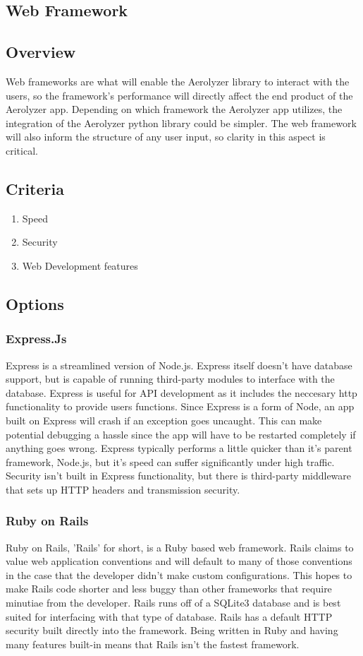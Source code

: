 \documentclass[onecolumn, draftclsnofoot,10pt, compsoc]{IEEEtran}
\begin{document}
\begin{singlespace}
\section{Web Framework}
\subsection{Overview}
Web frameworks are what will enable the Aerolyzer library to interact with the users, so the framework's performance will directly affect the end product of the Aerolyzer app. Depending on which framework the Aerolyzer app utilizes, the integration of the Aerolyzer python library could be simpler. The web framework will also inform the structure of any user input, so clarity in this aspect is critical.
\subsection{Criteria}
\begin{enumerate}
\item Speed
\item Security
\item Web Development features
\end{enumerate}
\subsection{Options}
\subsubsection{Express.Js}
Express is a streamlined version of Node.js.
Express itself doesn't have database support, but is capable of running third-party modules to interface with the database.
Express is useful for API development as it includes the neccesary http functionality to provide users functions.
Since Express is a form of Node, an app built on Express will crash if an exception goes uncaught. This can make potential debugging a hassle since the app will have to be restarted completely if anything goes wrong.
Express typically performs a little quicker than it's parent framework, Node.js, but it's speed can suffer significantly under high traffic.
Security isn't built in Express functionality, but there is third-party middleware that sets up HTTP headers and transmission security.
\cite{Express}
\subsubsection{Ruby on Rails}
Ruby on Rails, 'Rails' for short, is a Ruby based web framework.
Rails claims to value web application conventions and will default to many of those conventions in the case that the developer didn't make custom configurations.
This hopes to make Rails code shorter and less buggy than other frameworks that require minutiae from the developer.
Rails runs off of a SQLite3 database and is best suited for interfacing with that type of database.
Rails has a default HTTP security built directly into the framework.
Being written in Ruby and having many features built-in means that Rails isn't the fastest framework.
\cite{Rails}

\end{singlespace}
\end{document}
